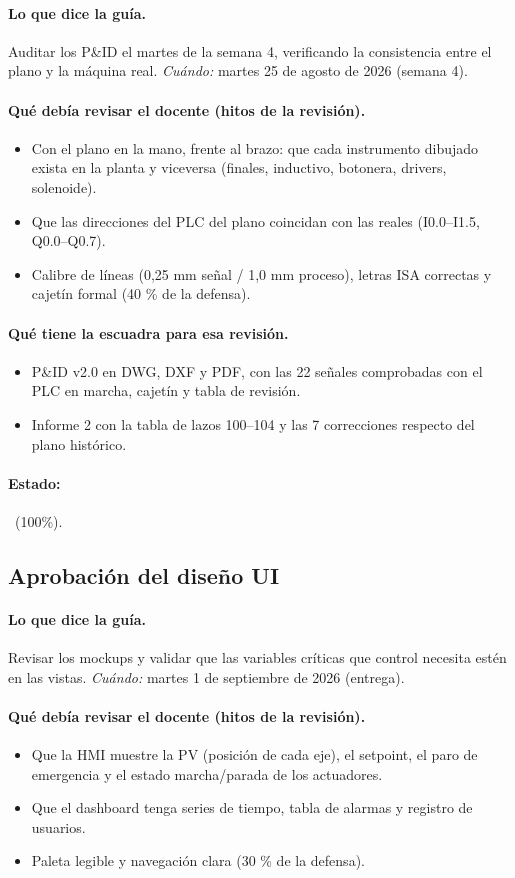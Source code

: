 \documentclass[a4paper,11pt]{article}
\begin{document}
\paragraph{Lo que dice la guía.} Auditar los P\&ID el martes de la semana 4, verificando la consistencia entre el plano y la máquina real. \textit{Cuándo:} martes 25 de agosto de 2026 (semana 4).
\paragraph{Qué debía revisar el docente (hitos de la revisión).}
\begin{itemize}
\item[$\square$] Con el plano en la mano, frente al brazo: que cada instrumento dibujado exista en la planta y viceversa (finales, inductivo, botonera, drivers, solenoide).
\item[$\square$] Que las direcciones del PLC del plano coincidan con las reales (I0.0–I1.5, Q0.0–Q0.7).
\item[$\square$] Calibre de líneas (0,25 mm señal / 1,0 mm proceso), letras ISA correctas y cajetín formal (40 \% de la defensa).
\end{itemize}
\paragraph{Qué tiene la escuadra para esa revisión.}
\begin{itemize}
\item P\&ID v2.0 en DWG, DXF y PDF, con las 22 señales comprobadas con el PLC en marcha, cajetín y tabla de revisión.
\item Informe 2 con la tabla de lazos 100–104 y las 7 correcciones respecto del plano histórico.
\end{itemize}
\paragraph{Estado:} \cumple~(100\%).
\subsection{Aprobación del diseño UI}
\paragraph{Lo que dice la guía.} Revisar los mockups y validar que las variables críticas que control necesita estén en las vistas. \textit{Cuándo:} martes 1 de septiembre de 2026 (entrega).
\paragraph{Qué debía revisar el docente (hitos de la revisión).}
\begin{itemize}
\item[$\square$] Que la HMI muestre la PV (posición de cada eje), el setpoint, el paro de emergencia y el estado marcha/parada de los actuadores.
\item[$\square$] Que el dashboard tenga series de tiempo, tabla de alarmas y registro de usuarios.
\item[$\square$] Paleta legible y navegación clara (30 \% de la defensa).
\end{itemize}
\end{document}
